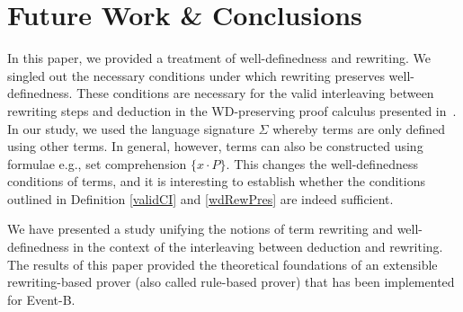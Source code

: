 \documentclass[copyright]{eptcs}
\begin{document}
\section{Future Work \& Conclusions}\label{future}
In this paper, we provided a treatment of well-definedness and rewriting. We singled out the necessary conditions under which rewriting preserves well-definedness. These conditions are necessary for the valid interleaving between rewriting steps and deduction in the WD-preserving proof calculus presented in~\cite{icfemMehta08}. In our study, we used the language signature $\Sigma$ whereby terms are only defined using other terms. In general, however, terms can also be constructed using formulae e.g., set comprehension $\{x\cdot P\}$. This changes the well-definedness conditions of terms, and it is interesting to establish whether the conditions outlined in Definition \ref{validCI} and \ref{wdRewPres} are indeed sufficient.
\par
We have presented a study unifying the notions of term rewriting and well-definedness in the context of the interleaving between deduction and rewriting. The results of this paper provided the theoretical foundations of an extensible rewriting-based prover (also called rule-based prover) that has been implemented for Event-B.




\end{document}

